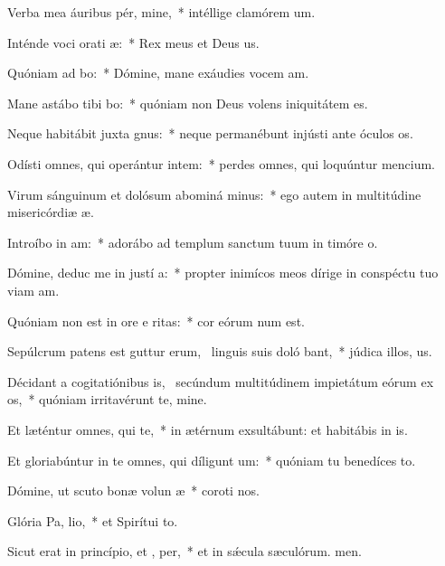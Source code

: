 \item Verba mea áuribus pér, mine,~* intéllige clamórem um.
\item Inténde voci orati æ:~* Rex meus et Deus us.
\item Quóniam ad  bo:~* Dómine, mane exáudies vocem am.
\item Mane astábo tibi  bo:~* quóniam non Deus volens iniquitátem  es.
\item Neque habitábit juxta  gnus:~* neque permanébunt injústi ante óculos os.
\item Odísti omnes, qui operántur intem:~* perdes omnes, qui loquúntur mencium.
\item Virum sánguinum et dolósum abominá minus:~* ego autem in multitúdine misericórdiæ æ.
\item Introíbo in  am:~* adorábo ad templum sanctum tuum in timóre o.
\item Dómine, deduc me in justí a:~* propter inimícos meos dírige in conspéctu tuo viam am.
\item Quóniam non est in ore e ritas:~* cor eórum num est.
\item Sepúlcrum patens est guttur erum,~\pscross{} linguis suis doló bant,~* júdica illos, us.
\item Décidant a cogitatiónibus is,~\pscross{} secúndum multitúdinem impietátum eórum ex os,~* quóniam irritavérunt te, mine.
\item Et læténtur omnes, qui   te,~* in ætérnum exsultábunt: et habitábis in is.
\item Et gloriabúntur in te omnes, qui díligunt  um:~* quóniam tu benedíces to.
\item Dómine, ut scuto bonæ volun æ~* coroti nos.
\item Glória Pa,  lio,~* et Spirítui to.
\item Sicut erat in princípio, et ,  per,~* et in sǽcula sæculórum. men.

